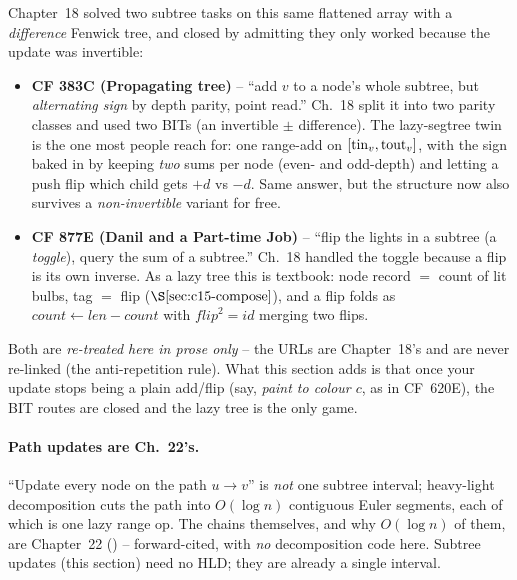 \begin{notebox}
Chapter~18 solved two subtree tasks on this same flattened array with a \emph{difference} Fenwick tree, and closed by admitting they only worked because the update was invertible:
\begin{itemize}[nosep,leftmargin=1.4em]
  \item \textbf{CF 383C (Propagating tree)} -- ``add \(v\) to a node's whole subtree, but \emph{alternating sign} by depth parity, point read.''  Ch.~18 split it into two parity classes and used two BITs (an invertible \(\pm\) difference).  The lazy-segtree twin is the one most people reach for: one range-add on \([\operatorname{tin}_v,\operatorname{tout}_v]\), with the sign baked in by keeping \emph{two} sums per node (even- and odd-depth) and letting a push flip which child gets \(+d\) vs \(-d\).  Same answer, but the structure now also survives a \emph{non-invertible} variant for free.
  \item \textbf{CF 877E (Danil and a Part-time Job)} -- ``flip the lights in a subtree (a \emph{toggle}), query the sum of a subtree.''  Ch.~18 handled the toggle because a flip is its own inverse.  As a lazy tree this is textbook: node record \(=\) count of lit bulbs, tag \(=\) flip (\(\secref{c15-compose}\)), and a flip folds as \(\mathit{count}\leftarrow\mathit{len}-\mathit{count}\) with \(\mathit{flip}^2=\mathit{id}\) merging two flips.
\end{itemize}
Both are \emph{re-treated here in prose only} -- the URLs are Chapter~18's and are never re-linked (the anti-repetition rule).  What this section adds is that once your update stops being a plain add/flip (say, \emph{paint to colour \(c\)}, as in CF~620E), the BIT routes are closed and the lazy tree is the only game.
\end{notebox}

\paragraph{Path updates are Ch.~22's.}
``Update every node on the path \(u\!\to\!v\)'' is \emph{not} one subtree interval; heavy-light decomposition cuts the path into \(O(\log n)\) contiguous Euler segments, each of which is one lazy range op.  The chains themselves, and why \(O(\log n)\) of them, are Chapter~22 () -- forward-cited, with \emph{no} decomposition code here.  Subtree updates (this section) need no HLD; they are already a single interval.


